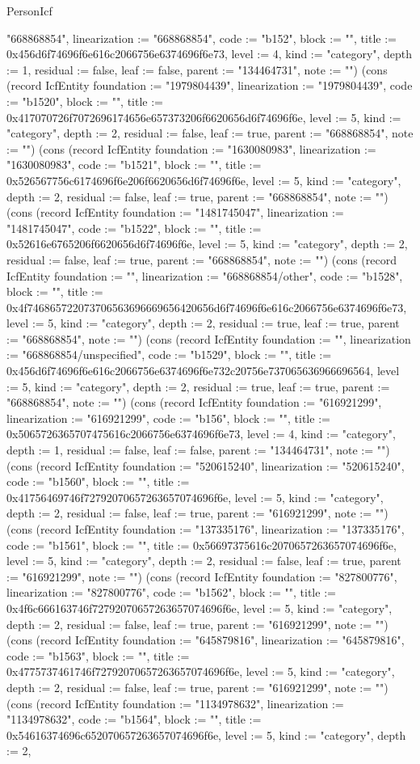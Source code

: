 \begin{lexlean}{PersonIcf}
\begin{semanticmodule}
{"668868854", linearization := "668868854", code := "b152", block := "", title := 0x456d6f74696f6e616c2066756e6374696f6e73, level := 4, kind := "category", depth := 1, residual := false, leaf := false, parent := "134464731", note := ""}) (cons (record IcfEntity {foundation := "1979804439", linearization := "1979804439", code := "b1520", block := "", title := 0x417070726f7072696174656e657373206f6620656d6f74696f6e, level := 5, kind := "category", depth := 2, residual := false, leaf := true, parent := "668868854", note := ""}) (cons (record IcfEntity {foundation := "1630080983", linearization := "1630080983", code := "b1521", block := "", title := 0x526567756c6174696f6e206f6620656d6f74696f6e, level := 5, kind := "category", depth := 2, residual := false, leaf := true, parent := "668868854", note := ""}) (cons (record IcfEntity {foundation := "1481745047", linearization := "1481745047", code := "b1522", block := "", title := 0x52616e6765206f6620656d6f74696f6e, level := 5, kind := "category", depth := 2, residual := false, leaf := true, parent := "668868854", note := ""}) (cons (record IcfEntity {foundation := "", linearization := "668868854/other", code := "b1528", block := "", title := 0x4f746865722073706563696669656420656d6f74696f6e616c2066756e6374696f6e73, level := 5, kind := "category", depth := 2, residual := true, leaf := true, parent := "668868854", note := ""}) (cons (record IcfEntity {foundation := "", linearization := "668868854/unspecified", code := "b1529", block := "", title := 0x456d6f74696f6e616c2066756e6374696f6e732c20756e737065636966696564, level := 5, kind := "category", depth := 2, residual := true, leaf := true, parent := "668868854", note := ""}) (cons (record IcfEntity {foundation := "616921299", linearization := "616921299", code := "b156", block := "", title := 0x5065726365707475616c2066756e6374696f6e73, level := 4, kind := "category", depth := 1, residual := false, leaf := false, parent := "134464731", note := ""}) (cons (record IcfEntity {foundation := "520615240", linearization := "520615240", code := "b1560", block := "", title := 0x41756469746f72792070657263657074696f6e, level := 5, kind := "category", depth := 2, residual := false, leaf := true, parent := "616921299", note := ""}) (cons (record IcfEntity {foundation := "137335176", linearization := "137335176", code := "b1561", block := "", title := 0x56697375616c2070657263657074696f6e, level := 5, kind := "category", depth := 2, residual := false, leaf := true, parent := "616921299", note := ""}) (cons (record IcfEntity {foundation := "827800776", linearization := "827800776", code := "b1562", block := "", title := 0x4f6c666163746f72792070657263657074696f6e, level := 5, kind := "category", depth := 2, residual := false, leaf := true, parent := "616921299", note := ""}) (cons (record IcfEntity {foundation := "645879816", linearization := "645879816", code := "b1563", block := "", title := 0x4775737461746f72792070657263657074696f6e, level := 5, kind := "category", depth := 2, residual := false, leaf := true, parent := "616921299", note := ""}) (cons (record IcfEntity {foundation := "1134978632", linearization := "1134978632", code := "b1564", block := "", title := 0x54616374696c652070657263657074696f6e, level := 5, kind := "category", depth := 2, }
\end{semanticmodule}
\end{lexlean}

